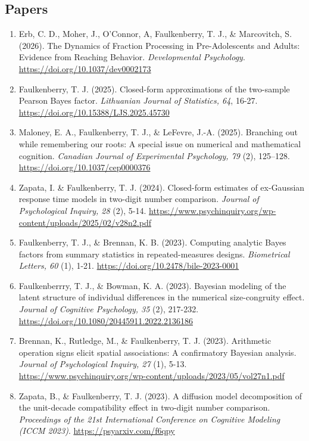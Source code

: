 \documentclass[article,10pt]{article}
\begin{document}
\subsection*{Papers}
\label{sec:org86f8bd5}
\begin{enumerate}
\item Erb, C. D., Moher, J., O'Connor, A, Faulkenberry, T. J., \& Marcovitch, S. (2026). The Dynamics of Fraction Processing in Pre-Adolescents and Adults: Evidence from Reaching Behavior. \emph{Developmental Psychology}. \url{https://doi.org/10.1037/dev0002173}
\item Faulkenberry, T. J. (2025). Closed-form approximations of the two-sample Pearson Bayes factor. \emph{Lithuanian Journal of Statistics, 64}, 16-27. \url{https://doi.org/10.15388/LJS.2025.45730}
\item Maloney, E. A., Faulkenberry, T. J., \& LeFevre, J.-A. (2025). Branching out while remembering our roots: A special issue on numerical and mathematical cognition. \emph{Canadian Journal of Experimental Psychology, 79} (2), 125–128. \url{https://doi.org/10.1037/cep0000376}
\item Zapata, I. \& Faulkenberry, T. J. (2024). Closed-form estimates of ex-Gaussian response time models in two-digit number comparison. \emph{Journal of Psychological Inquiry, 28} (2), 5-14. \url{https://www.psychinquiry.org/wp-content/uploads/2025/02/v28n2.pdf}
\item Faulkenberry, T. J., \& Brennan, K. B. (2023). Computing analytic Bayes factors from summary statistics in repeated-measures designs. \emph{Biometrical Letters, 60} (1), 1-21. \url{https://doi.org/10.2478/bile-2023-0001}
\item Faulkenberrry, T. J., \& Bowman, K. A. (2023). Bayesian modeling of the latent structure of individual differences in the numerical size-congruity effect. \emph{Journal of Cognitive Psychology, 35} (2), 217-232. \url{https://doi.org/10.1080/20445911.2022.2136186}
\item Brennan, K., Rutledge, M., \& Faulkenberry, T. J. (2023). Arithmetic operation signs elicit spatial associations: A confirmatory Bayesian analysis. \emph{Journal of Psychological Inquiry, 27} (1), 5-13. \url{https://www.psychinquiry.org/wp-content/uploads/2023/05/vol27n1.pdf}
\item Zapata, B., \& Faulkenberry, T. J. (2023). A diffusion model decomposition of the unit-decade compatibility effect in two-digit number comparison. \emph{Proceedings of the 21st International Conference on Cognitive Modeling (ICCM 2023)}. \url{https://psyarxiv.com/f6qpy}

\end{enumerate}
\end{document}
